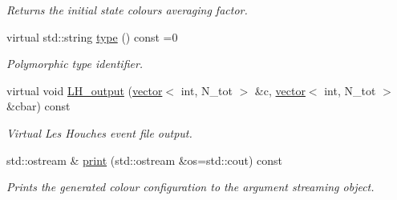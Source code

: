 \begin{DoxyCompactItemize}
\begin{DoxyCompactList}\small\item\em Returns the initial state colours averaging factor. \end{DoxyCompactList}\item 
\hypertarget{a00079_a3dca4a3cce4eab2b9848c65c1cf096b8}{}virtual std\+::string \hyperlink{a00079_a3dca4a3cce4eab2b9848c65c1cf096b8}{type} () const =0\label{a00079_a3dca4a3cce4eab2b9848c65c1cf096b8}

\begin{DoxyCompactList}\small\item\em Polymorphic type identifier. \end{DoxyCompactList}\item 
\hypertarget{a00079_a192e163e0209a44fbef5a4ec6cade925}{}virtual void \hyperlink{a00079_a192e163e0209a44fbef5a4ec6cade925}{L\+H\+\_\+output} (\hyperlink{a00579}{vector}$<$ int, N\+\_\+tot $>$ \&c, \hyperlink{a00579}{vector}$<$ int, N\+\_\+tot $>$ \&cbar) const \label{a00079_a192e163e0209a44fbef5a4ec6cade925}

\begin{DoxyCompactList}\small\item\em Virtual Les Houches event file output. \end{DoxyCompactList}\item 
std\+::ostream \& \hyperlink{a00079_adcd79837d379ebe03c744ec7cf5e7ca3}{print} (std\+::ostream \&os=std\+::cout) const 
\begin{DoxyCompactList}\small\item\em Prints the generated colour configuration to the argument streaming object. \end{DoxyCompactList}\end{DoxyCompactItemize}
